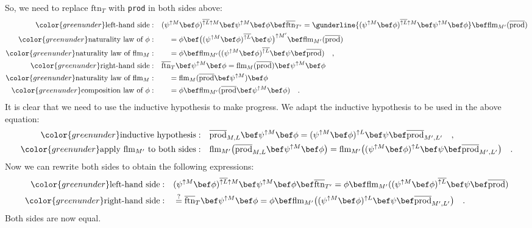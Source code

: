 So, we need to replace $\text{ftn}_{T}$ with \lstinline!prod! in
both sides above:
\begin{align*}
{\color{greenunder}\text{left-hand side}:}\quad & (\psi^{\uparrow M}\bef\phi)^{\overline{\uparrow L}\uparrow M}\bef\psi^{\uparrow M}\bef\phi\bef\overline{\text{ftn}}_{T^{\prime}}=\gunderline{(\psi^{\uparrow M}\bef\phi)^{\overline{\uparrow L}\uparrow M}\bef\psi^{\uparrow M}\bef\phi}\bef\text{flm}_{M^{\prime}}(\overline{\text{prod}})\\
{\color{greenunder}\text{naturality law of }\phi:}\quad & \quad=\phi\bef\big((\psi^{\uparrow M}\bef\phi)^{\overline{\uparrow L}}\bef\psi\big)^{\uparrow M^{\prime}}\bef\text{flm}_{M^{\prime}}(\overline{\text{prod}})\\
{\color{greenunder}\text{naturality law of }\text{flm}_{M}:}\quad & \quad=\phi\bef\text{flm}_{M^{\prime}}((\psi^{\uparrow M}\bef\phi)^{\overline{\uparrow L}}\bef\psi\bef\overline{\text{prod}})\quad,\\
{\color{greenunder}\text{right-hand side}:}\quad & \overline{\text{ftn}}_{T}\bef\psi^{\uparrow M}\bef\phi=\text{flm}_{M}(\overline{\text{prod}})\bef\psi^{\uparrow M}\bef\phi\\
{\color{greenunder}\text{naturality law of }\text{flm}_{M}:}\quad & \quad=\text{flm}_{M}(\overline{\text{prod}}\bef\psi^{\uparrow M})\bef\phi\\
{\color{greenunder}\text{composition law of }\phi:}\quad & \quad=\phi\bef\text{flm}_{M^{\prime}}(\overline{\text{prod}}\bef\psi^{\uparrow M}\bef\phi)\quad.
\end{align*}
It is clear that we need to use the inductive hypothesis to make progress.
We adapt the inductive hypothesis to be used in the above equation:
\begin{align*}
{\color{greenunder}\text{inductive hypothesis}:}\quad & \overline{\text{prod}}_{M,L}\bef\psi^{\uparrow M}\bef\phi=(\psi^{\uparrow M}\bef\phi)^{\uparrow L}\bef\psi\bef\overline{\text{prod}}_{M^{\prime},L^{\prime}}\quad,\\
{\color{greenunder}\text{apply }\text{flm}_{M^{\prime}}\text{ to both sides}:}\quad & \text{flm}_{M^{\prime}}\big(\overline{\text{prod}}_{M,L}\bef\psi^{\uparrow M}\bef\phi\big)=\text{flm}_{M^{\prime}}\big((\psi^{\uparrow M}\bef\phi)^{\uparrow L}\bef\psi\bef\overline{\text{prod}}_{M^{\prime},L^{\prime}}\big)\quad.
\end{align*}
Now we can rewrite both sides to obtain the following expressions:
\begin{align*}
{\color{greenunder}\text{left-hand side}:}\quad & (\psi^{\uparrow M}\bef\phi)^{\overline{\uparrow L}\uparrow M}\bef\psi^{\uparrow M}\bef\phi\bef\overline{\text{ftn}}_{T^{\prime}}=\phi\bef\text{flm}_{M^{\prime}}((\psi^{\uparrow M}\bef\phi)^{\overline{\uparrow L}}\bef\psi\bef\overline{\text{prod}})\\
{\color{greenunder}\text{right-hand side}:}\quad & \overset{?}{=}\overline{\text{ftn}}_{T}\bef\psi^{\uparrow M}\bef\phi=\phi\bef\text{flm}_{M^{\prime}}\big((\psi^{\uparrow M}\bef\phi)^{\uparrow L}\bef\psi\bef\overline{\text{prod}}_{M^{\prime},L^{\prime}}\big)\quad.
\end{align*}
Both sides are now equal.

